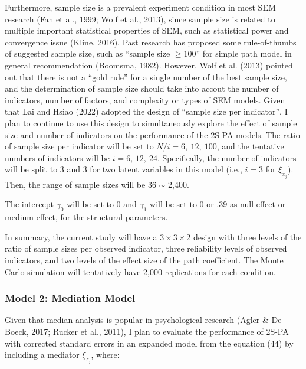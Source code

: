 \documentclass[
  11pt,
  man]{apa6}
\begin{document}
Furthermore, sample size is a prevalent experiment condition in most SEM research (Fan et al., 1999; Wolf et al., 2013), since sample size is related to multiple important statistical properties of SEM, such as statistical power and convergence issue (Kline, 2016). Past research has proposed some rule-of-thumbs of suggested sample size, such as ``sample size \(\ge 100\)'' for simple path model in general recommendation (Boomsma, 1982). However, Wolf et al. (2013) pointed out that there is not a ``gold rule'' for a single number of the best sample size, and the determination of sample size should take into accout the number of indicators, number of factors, and complexity or types of SEM models. Given that Lai and Hsiao (2022) adopted the design of ``sample size per indicator'', I plan to continue to use this design to simultaneously explore the effect of sample size and number of indicators on the performance of the 2S-PA models. The ratio of sample size per indicator will be set to \(N/i = 6, \ 12, \ 100\), and the tentative numbers of indicators will be \(i = 6, \, 12, \ 24\). Specifically, the number of indicators will be split to 3 and 3 for two latent variables in this model (i.e., \(i = 3\) for \(\xi_{x_{j}}\)). Then, the range of sample sizes will be 36 \(\sim\) 2,400.

The intercept \(\gamma_{0}\) will be set to 0 and \(\gamma_{1}\) will be set to 0 or .39 as null effect or medium effect, for the structural parameters.

In summary, the current study will have a \(3 \times 3 \times 2\) design with three levels of the ratio of sample sizes per observed indicator, three reliability levels of observed indicators, and two levels of the effect size of the path coefficient. The Monte Carlo simulation will tentatively have 2,000 replications for each condition.

\hypertarget{model-2-mediation-model}{%
\subsubsection{Model 2: Mediation Model}\label{model-2-mediation-model}}

Given that median analysis is popular in psychological research (Agler \& De Boeck, 2017; Rucker et al., 2011), I plan to evaluate the performance of 2S-PA with corrected standard errors in an expanded model from the equation (44) by including a mediator \(\xi_{z_{j}}\), where:
\end{document}
